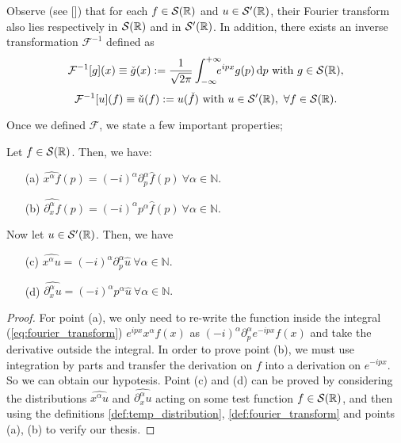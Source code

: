  \begin{oss}
 	 Observe (see [\citealp[Chap. 8]{fried2}]) that for each $f\in\mathcal{S}({\mathbb R})$ and $u\in\mathcal{S}'({\mathbb R})$, their Fourier transform also lies respectively in $\mathcal{S}({\mathbb R})$ and in $\mathcal{S}'({\mathbb R})$. In addition, there exists an inverse transformation $\mathcal{F}^{-1}$ defined as
 	 \begin{equation}
 	 \mathcal{F}^{-1}[g](x)\equiv\check{g}(x):=\frac{1}{\sqrt{2\pi}}\int_{-\infty}^{+\infty}\!\!\!\!e^{ipx}g(p)\, \mathrm d p\ \text{with}\ g\in\mathcal{S}({\mathbb R}),
 	 \end{equation}
 	 \begin{equation}
 	 \mathcal{F}^{-1}[u](f)\equiv \check{u}(f):=u(\check{f})\ \text{with}\ u\in\mathcal{S}'({\mathbb R}),\ \forall f\in\mathcal{S}({\mathbb R}).
 	 \end{equation}
 \end{oss}

  Once we defined $\mathcal{F}$, we state a few important properties;
  
 \begin{theorem}
 	\label{th:derivation}
 	Let $f\in \mathcal{S}({\mathbb R})$. Then, we have:
 	\begin{itemize}
 		\item[(a)] $\hat{x^\alpha f}(p)=(-i)^\alpha\partial_p^\alpha\hat{f}(p)\ \forall \alpha\in\mathbb{N}$.
 		\item[(b)] $\hat{\partial_x^\alpha f}(p)=(-i)^\alpha p^\alpha\hat{f}(p)\ \forall \alpha\in \mathbb{N}.$ 
 	\end{itemize}
 	Now let $u\in\mathcal{S}'({\mathbb R})$. Then, we have
 	\begin{itemize}
 	\item[(c)] $\hat{x^\alpha u}=(-i)^\alpha\partial_p^\alpha\hat{u}\ \forall \alpha\in\mathbb{N}$.
 	\item[(d)] $\hat{\partial_x^\alpha u}=(-i)^\alpha p^\alpha\hat{u}\ \forall \alpha\in \mathbb{N}.$ 
 	\end{itemize}
 \end{theorem}
 \begin{proof}
 	For point (a), we only need to re-write the function inside the integral (\ref{eq:fourier_transform}) $e^{ipx}x^\alpha f(x)$ as $(-i)^\alpha\partial_p^\alpha e^{-ipx}f(x)$ and take the derivative outside the integral. In order to prove point (b), we must use integration by parts and transfer the derivation on $f$ into a derivation on $e^{-ipx}$. So we can obtain our hypotesis. Point (c) and (d) can be proved by considering the distributions $ \hat{x^\alpha u}$ and $\hat{\partial_x^\alpha u}$ acting on some test function $f\in\mathcal{S}({\mathbb R})$, and then using the definitions \ref{def:temp_distribution}, \ref{def:fourier_transform} and points (a), (b) to verify our thesis.
 \end{proof}
 
